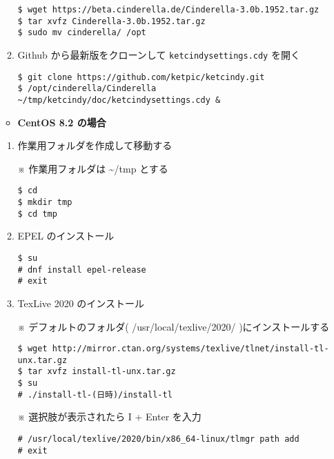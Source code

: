 \documentclass{ujarticle}
\begin{document}
\begin{enumerate}[\bf\large 1.]
\begin{enumerate}[(1)]
\begin{verbatim}
$ wget https://beta.cinderella.de/Cinderella-3.0b.1952.tar.gz
$ tar xvfz Cinderella-3.0b.1952.tar.gz
$ sudo mv cinderella/ /opt
\end{verbatim}

\item Github から最新版をクローンして \verb|ketcindysettings.cdy| を開く
\begin{verbatim}
$ git clone https://github.com/ketpic/ketcindy.git
$ /opt/cinderella/Cinderella ~/tmp/ketcindy/doc/ketcindysettings.cdy &
\end{verbatim}

\end{enumerate}

\vspace{\baselineskip}

\begin{itemize}
\item {\bf CentOS 8.2 の場合}
\end{itemize}

\begin{enumerate}[(1)]

\item 作業用フォルダを作成して移動する

※ 作業用フォルダは \textasciitilde/tmp とする

\begin{verbatim}
$ cd
$ mkdir tmp
$ cd tmp
\end{verbatim}

\item EPEL のインストール

\begin{verbatim}
$ su
# dnf install epel-release
# exit
\end{verbatim}

\item TexLive 2020 のインストール

※ デフォルトのフォルダ( /usr/local/texlive/2020/ )にインストールする

\begin{verbatim}
$ wget http://mirror.ctan.org/systems/texlive/tlnet/install-tl-unx.tar.gz
$ tar xvfz install-tl-unx.tar.gz
$ su
# ./install-tl-(日時)/install-tl
\end{verbatim}

※ 選択肢が表示されたら I + Enter を入力

\begin{verbatim}
# /usr/local/texlive/2020/bin/x86_64-linux/tlmgr path add
# exit
\end{verbatim}


\end{enumerate}
\end{enumerate}
\end{document}
